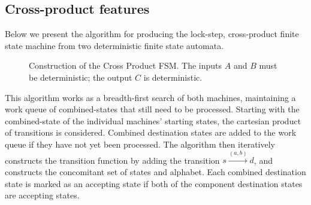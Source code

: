 \documentclass[sigplan,anonymous, review]{acmart}
\begin{document}
\subsection{Cross-product features}\label{sec:cpalg}

Below we present the algorithm for producing the lock-step, cross-product finite state machine from two deterministic finite state automata. 

\begin{figure}[htb]
\renewcommand{\algorithmicrequire}{\textbf{Inputs:}}
\renewcommand{\algorithmicensure}{\textbf{Output:}}
\renewcommand\thealgorithm{}
\begin{algorithmic}[1]

 \hfill{}
 \hfill{}
        \ENDIF
        \ENDIF
    \ENDFOR
\ENDWHILE
\end{algorithmic}
\caption{Construction of the Cross Product FSM.  The inputs $A$ and $B$ must be deterministic;  the output $C$ is deterministic.}\label{fig:algo}
\end{figure}

This algorithm works as a breadth-first search of both machines, maintaining a work queue of combined-states that still need to be processed. Starting with the combined-state of the individual machines' starting states, the cartesian product of transitions is considered. Combined destination states are added to the work queue if they have not yet been processed. The algorithm then iteratively constructs the transition function by adding the transition $s \xrightarrow{(a,b)} d$, and constructs the concomitant set of states and alphabet. Each combined destination state is marked as an accepting state if both of the component destination states are accepting states. 
\end{document}
